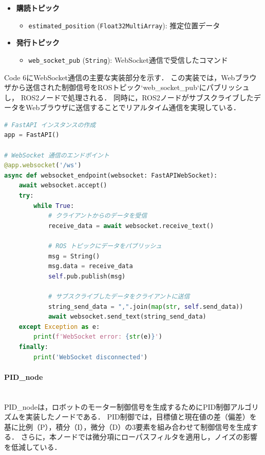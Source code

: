 \begin{itemize}
    \item \textbf{購読トピック}
          \begin{itemize}
              \item \texttt{estimated\_position} (\texttt{Float32MultiArray}): 推定位置データ
          \end{itemize}
    \item \textbf{発行トピック}
          \begin{itemize}
              \item \texttt{web\_socket\_pub} (\texttt{String}): WebSocket通信で受信したコマンド
          \end{itemize}
\end{itemize}


Code 6にWebSocket通信の主要な実装部分を示す．
この実装では，Webブラウザから送信された制御信号をROSトピック`web\_socket\_pub`にパブリッシュし，
ROS2ノードで処理される．
同時に，ROS2ノードがサブスクライブしたデータをWebブラウザに送信することでリアルタイム通信を実現している．

\begin{lstlisting}[language=Python, caption=WebSocket通信の主要部分 (web\_socket\_node.py)]
# FastAPI インスタンスの作成
app = FastAPI()

# WebSocket 通信のエンドポイント
@app.websocket('/ws')
async def websocket_endpoint(websocket: FastAPIWebSocket):
    await websocket.accept()
    try:
        while True:
            # クライアントからのデータを受信
            receive_data = await websocket.receive_text()
            
            # ROS トピックにデータをパブリッシュ
            msg = String()
            msg.data = receive_data
            self.pub.publish(msg)

            # サブスクライブしたデータをクライアントに送信
            string_send_data = ",".join(map(str, self.send_data))
            await websocket.send_text(string_send_data)
    except Exception as e:
        print(f'WebSocket error: {str(e)}')
    finally:
        print('WebSocket disconnected')
\end{lstlisting}

\newpage
\paragraph{PID\_node}\mbox{}\\
PID\_nodeは，ロボットのモーター制御信号を生成するためにPID制御アルゴリズムを実装したノードである．
PID制御では，目標値と現在値の差（偏差）を基に比例（P），積分（I），微分（D）の3要素を組み合わせて制御信号を生成する．
さらに，本ノードでは微分項にローパスフィルタを適用し，ノイズの影響を低減している．

